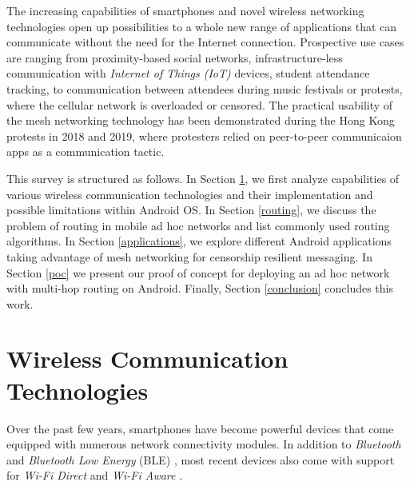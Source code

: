 \documentclass[conference,compsoc]{IEEEtran}
\begin{document}
The increasing capabilities of smartphones and novel wireless networking technologies open up possibilities to a whole new range of applications that can communicate without the need for the Internet connection. Prospective use cases are ranging from proximity-based social networks, infrastructure-less communication with \textit{Internet of Things (IoT)} devices, student attendance tracking, to communication between attendees during music festivals or protests, where the cellular network is overloaded or censored. The practical usability of the mesh networking technology has been demonstrated during the Hong Kong protests in 2018 and 2019, where protesters relied on peer-to-peer communicaion apps as a communication tactic. \cite{forbes:hk}




This survey is structured as follows. In Section \ref{wirelesstech}, we first analyze capabilities of various wireless communication technologies and their implementation and possible limitations within Android OS. In Section \ref{routing}, we discuss the problem of routing in mobile ad hoc networks and list commonly used routing algorithms.
In Section \ref{applications}, we explore different Android applications taking advantage of mesh networking for censorship resilient messaging. In Section \ref{poc} we present our proof of concept for deploying an ad hoc network with multi-hop routing on Android. Finally, Section \ref{conclusion} concludes this work.

\section{Wireless Communication Technologies} \label{wirelesstech}

Over the past few years, smartphones have become powerful devices that come equipped with numerous network connectivity modules. In addition to \textit{Bluetooth} and \textit{Bluetooth Low Energy} (BLE) \cite{android:ble}, most recent devices also come with support for \textit{Wi-Fi Direct} \cite{android:wifip2p} and \textit{Wi-Fi Aware} \cite{android:wifiaware}.
\end{document}
